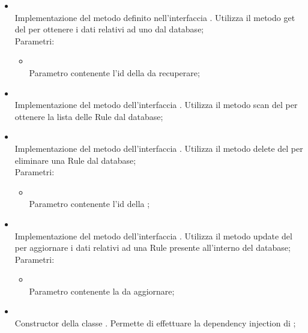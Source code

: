 \begin{itemize}
\begin{itemize}
\begin{itemize}
		\end{itemize}
		\item[]  \\		Implementazione del metodo definito nell'interfaccia . Utilizza il metodo get del  per ottenere i dati relativi ad uno  dal database;\\
		Parametri:
		\begin{itemize}
			\item {} \\
			Parametro contenente l'id della  da recuperare;
		\end{itemize}
		\item[]  \\		Implementazione del metodo dell'interfaccia . Utilizza il metodo scan del  per ottenere la lista delle Rule dal database;\\
		\item[]  \\		Implementazione del metodo dell'interfaccia . Utilizza il metodo delete del  per eliminare una Rule dal database;\\
		Parametri:
		\begin{itemize}
			\item {} \\
			Parametro contenente l'id della ;
		\end{itemize}
		\item[]  \\		Implementazione del metodo dell'interfaccia . Utilizza il metodo update del  per aggiornare i dati relativi ad una Rule presente all'interno del database;\\
		Parametri:
		\begin{itemize}
			\item {} \\
			Parametro contenente la  da aggiornare;
		\end{itemize}
		\item[]  \\		Constructor della classe . Permette di effettuare la dependency injection di ;\\

\end{itemize}
\end{itemize}
